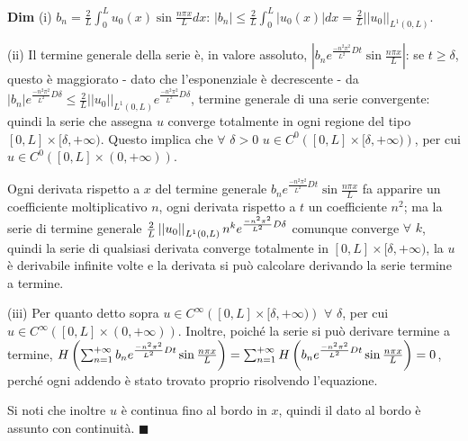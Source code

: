 \documentclass{article}
\begin{document}
\textbf{Dim} (i) $b_{n}=\frac{2}{L}\int_{0}^{L}u_{0}\left( x\right) \sin 
\frac{n\pi x}{L}dx$: $\left\vert b_{n}\right\vert \leq \frac{2}{L}%
\int_{0}^{L}\left\vert u_{0}\left( x\right) \right\vert dx=\frac{2}{L}%
\left\vert \left\vert u_{0}\right\vert \right\vert _{L^{1}\left( 0,L\right)
} $.

(ii) Il termine generale della serie \`{e}, in valore assoluto, $\left\vert
b_{n}e^{\frac{-n^{2}\pi ^{2}}{L^{2}}Dt}\sin \frac{n\pi x}{L}\right\vert $:
se $t\geq \delta $, questo \`{e} maggiorato - dato che l'esponenziale \`{e}
decrescente - da $\left\vert b_{n}\right\vert e^{\frac{-n^{2}\pi ^{2}}{L^{2}}%
D\delta }\leq \frac{2}{L}\left\vert \left\vert u_{0}\right\vert \right\vert
_{L^{1}\left( 0,L\right) }e^{\frac{-n^{2}\pi ^{2}}{L^{2}}D\delta }$, termine
generale di una serie convergente: quindi la serie che assegna $u$ converge
totalmente in ogni regione del tipo $\left[ 0,L\right] \times \lbrack \delta
,+\infty )$. Questo implica che $\forall $ $\delta >0$ $u\in C^{0}\left( %
\left[ 0,L\right] \times \lbrack \delta ,+\infty )\right) $, per cui $u\in
C^{0}\left( \left[ 0,L\right] \times \left( 0,+\infty \right) \right) $.

Ogni derivata rispetto a $x$ del termine generale $b_{n}e^{\frac{-n^{2}\pi
^{2}}{L^{2}}Dt}\sin \frac{n\pi x}{L}$ fa apparire un coefficiente
moltiplicativo $n$, ogni derivata rispetto a $t$ un coefficiente $n^{2}$; ma
la serie di termine generale $\frac{2}{L}\left\vert \left\vert
u_{0}\right\vert \right\vert _{L^{1}\left( 0,L\right) }n^{k}e^{\frac{%
-n^{2}\pi ^{2}}{L^{2}}D\delta }$ comunque converge $\forall $ $k$, quindi la
serie di qualsiasi derivata converge totalmente in $\left[ 0,L\right] \times
\lbrack \delta ,+\infty )$, la $u$ \`{e} derivabile infinite volte e la
derivata si pu\`{o} calcolare derivando la serie termine a termine.

(iii) Per quanto detto sopra $u\in C^{\infty }\left( \left[ 0,L\right]
\times \lbrack \delta ,+\infty )\right) $ $\forall $ $\delta $, per cui $%
u\in C^{\infty }\left( \left[ 0,L\right] \times \left( 0,+\infty \right)
\right) $. Inoltre, poich\'{e} la serie si pu\`{o} derivare termine a
termine, $H\left( \sum_{n=1}^{+\infty }b_{n}e^{\frac{-n^{2}\pi ^{2}}{L^{2}}%
Dt}\sin \frac{n\pi x}{L}\right) =\sum_{n=1}^{+\infty }H\left( b_{n}e^{\frac{%
-n^{2}\pi ^{2}}{L^{2}}Dt}\sin \frac{n\pi x}{L}\right) =0$, perch\'{e} ogni
addendo \`{e} stato trovato proprio risolvendo l'equazione.

Si noti che inoltre $u$ \`{e} continua fino al bordo in $x$, quindi il dato
al bordo \`{e} assunto con continuit\`{a}. $\blacksquare $
\end{document}
